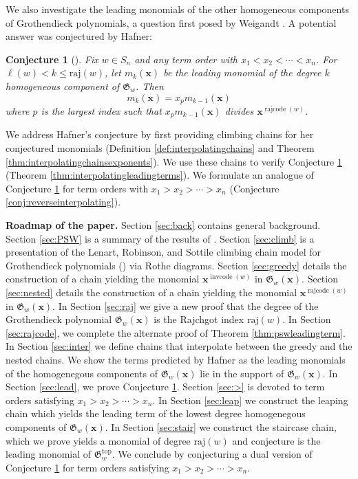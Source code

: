 \documentclass[11pt]{amsart}
\newtheorem{conjecture}[theorem]{Conjecture}
\theoremstyle{definition}
\theoremstyle{named}
\DeclareMathOperator{\cc}{\mathrm{invcode}} %
\DeclareMathOperator{\rr}{\mathrm{rajcode}} %
\newcommand{\absrajcode}[1]{\mathrm{raj}(#1)}
\begin{document}
		
	We also investigate the leading monomials of the other homogeneous components of Grothendieck polynomials, a question first posed by Weigandt \cite{annacascade}. A potential answer was conjectured by Hafner:	
	\begin{conjecture}[{\cite[Conjecture 4.1]{elena1}}]
		\label{conj:elena}
		Fix $w\in S_n$ and any term order with $x_1<x_2<\cdots<x_n$. For $\ell(w)< k\leq \absrajcode{w}$, let $m_k(\bm{x})$ be the leading monomial of the degree $k$ homogeneous component of $\mathfrak{G}_w$. Then
		\[m_k(\bm{x}) = x_pm_{k-1}(\bm{x}) \]
		where $p$ is the largest index such that $x_p m_{k-1}(\bm{x})$ divides $\bm{x}^{\rr(w)}$.
	\end{conjecture}
	
	We address Hafner's conjecture by first providing climbing chains for her conjectured monomials (Definition \ref{def:interpolatingchains} and Theorem \ref{thm:interpolatingchainsexponents}). We use these chains to verify Conjecture \ref{conj:elena} (Theorem \ref{thm:interpolatingleadingterms}). We formulate an analogue of Conjecture \ref{conj:elena} for term orders with $x_1>x_2>\cdots>x_n$ (Conjecture \ref{conj:reverseinterpolating}).
	
	\medskip
	
	\noindent \textbf{Roadmap of the paper.}
	Section \ref{sec:back} contains general background.
	Section \ref{sec:PSW} is a summary of the results of \cite{PSW}.
	Section \ref{sec:climb} is a presentation of the Lenart, Robinson, and Sottile climbing chain model for Grothendieck polynomials (\cite{LRS}) via Rothe diagrams. 
	 Section \ref{sec:greedy} details the construction of a chain yielding the monomial $\bm{x}^{\cc(w)}$ in $\mathfrak{G}_w(\bm{x})$. 
	 Section \ref{sec:nested} details the construction of a chain yielding the monomial $\bm{x}^{\rr(w)}$ in $\mathfrak{G}_w(\bm{x})$. 
	In Section \ref{sec:raj} we give a new proof that the degree of the Grothendieck polynomial $\mathfrak{G}_w(\bm{x})$ is the Rajchgot index $\absrajcode{w}$. 
	In Section \ref{sec:rajcode}, we complete the alternate proof of Theorem \ref{thm:pswleadingterm}.
	In Section \ref{sec:inter} we define chains that interpolate between the greedy and the nested chains. We show the terms predicted by Hafner as the leading monomials of the homogenegous components of $\mathfrak{G}_w(\bm{x})$ lie in the support of $\mathfrak{G}_w(\bm{x})$. 
	In Section \ref{sec:lead}, we prove Conjecture \ref{conj:elena}.
	Section \ref{sec:>} is devoted to term orders satisfying $x_1>x_2>\cdots>x_n$. In Section \ref{sec:leap} we construct the leaping chain which yields the leading term of the lowest degree homogenegous components of $\mathfrak{G}_w(\bm{x})$. 
	In Section \ref{sec:stair} we construct the staircase chain, which we prove yields a monomial of degree $\absrajcode{w}$ and conjecture is the leading monomial of $\mathfrak{G}_w^{\mathrm{top}}$. We conclude by conjecturing a dual version of Conjecture \ref{conj:elena} for term orders satisfying $x_1>x_2>\cdots>x_n$. 
\end{document}
